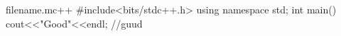\documentclass{ctexart}
\begin{document}
\begin{code}{filename.m}{c++}
#include<bits/stdc++.h>
using namespace std;
int main(){
  cout<<"Good"<<endl;   //guud
}
\end{code}
\end{document}
